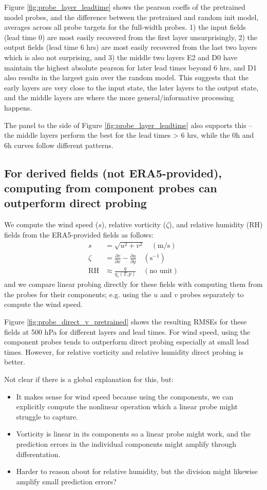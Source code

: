 \documentclass{article}
\theoremstyle{plain}
\theoremstyle{definition}
\begin{document}
Figure \ref{fig:probe_layer_leadtime} shows the pearson coeffs of the pretrained model probes, and the difference between the pretrained and random init model, averages across all probe targets for the full-width probes. 1) the input fields (lead time 0) are most easily recovered from the first layer unsurprisingly, 2) the output fields (lead time 6 hrs) are most easily recovered from the last two layers which is also not surprising, and 3) the middle two layers E2 and D0 have maintain the highest absolute pearson for later lead times beyond 6 hrs, and D1 also results in the largest gain over the random model. This suggests that the early layers are very close to the input state, the later layers to the output state, and the middle layers are where the more general/informative processing happens.

The panel to the side of Figure \ref{fig:probe_layer_leadtime} also supports this -- the middle layers perform the best for the lead times > 6 hrs, while the 0h and 6h curves follow different patterns.

\subsection{For derived fields (not ERA5-provided), computing from component probes can outperform direct probing}

We compute the wind speed ($s$), relative vorticity ($\zeta$), and relative humidity (RH) fields from the ERA5-provided fields as follows:
\begin{align}
s &= \sqrt{u^2 + v^2} \quad (\text{m/s}) \\
\zeta &= \frac{\partial v}{\partial x} - \frac{\partial u}{\partial y} \quad (\text{s}^{-1}) \\
\text{RH} &\approx \frac{q}{q_s(T, p)} \quad (\text{no unit})
\end{align}
and we compare linear probing directly for these fields with computing them from the probes for their components; e.g. using the $u$ and $v$ probes separately to compute the wind speed.

Figure \ref{fig:probe_direct_v_pretrained} shows the resulting RMSEs for these fields at 500 hPa for different layers and lead times. For wind speed, using the component probes tends to outperform direct probing especially at small lead times. However, for relative vorticity and relative humidity direct probing is better.

Not clear if there is a global explanation for this, but:
\begin{itemize}
\item It makes sense for wind speed because using the components, we can explicitly compute the nonlinear operation which a linear probe might struggle to capture.
\item Vorticity is linear in its components so a linear probe might work, and the prediction errors in the individual components might amplify through differentation.
\item Harder to reason about for relative humidity, but the division might likewise amplify small prediction errors?
\end{itemize}
\end{document}
